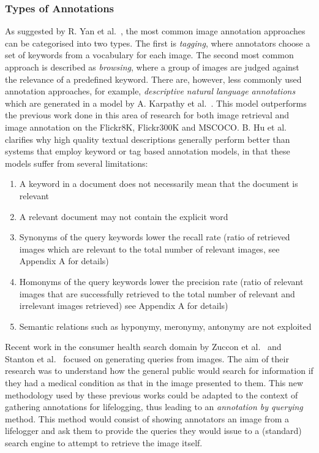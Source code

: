 \documentclass[12pt,a4paper]{article}
\begin{document}
\subsubsection{Types of Annotations}
As suggested by R. Yan et al.~\cite{yan2008learning}, the most common image annotation approaches can be categorised into two types. The first is \textit{tagging}, where annotators choose a set of keywords from a vocabulary for each image. The second most common approach is described as \textit{browsing}, where a group of images are judged against the relevance of a predefined keyword. There are, however, less commonly used annotation approaches, for example, \textit{descriptive natural language annotations} which are generated in a model by A. Karpathy et al.~\cite{karpathy2015deep}. This model outperforms the previous work done in this area of research for both image retrieval and image annotation on the Flickr8K, Flickr300K and MSCOCO. B. Hu et al.~\cite{hu2003ontology} clarifies why high quality textual descriptions generally perform better than systems that employ keyword or tag based annotation models, in that these models suffer from several limitations:
\begin{enumerate}
    \item A keyword in a document does not necessarily mean that the document is relevant
    \item A relevant document may not contain the explicit word
    \item Synonyms of the query keywords lower the recall rate (ratio of retrieved images which are relevant to the total number of relevant images, see Appendix A for details)
    \item Homonyms of the query keywords lower the precision rate  (ratio of relevant images that are successfully retrieved to the total number of relevant and irrelevant images retrieved) see Appendix A for details)
    \item Semantic relations such as hyponymy, meronymy, antonymy are not exploited
\end{enumerate}

Recent work in the consumer health search domain by Zuccon et al.~\cite{quteprints82599} and Stanton et al.~\cite{stanton2014circumlocution} focused on generating queries from images. The aim of their research was to understand how the general public would search for information if they had a medical condition as that in the image presented to them. This new methodology used by these previous works could be adapted to the context of gathering annotations for lifelogging, thus leading to an \textit{annotation by querying} method. This method would consist of showing annotators an image from a lifelogger and ask them to provide the queries they would issue to a (standard) search engine to attempt to retrieve the image itself.
\end{document}
